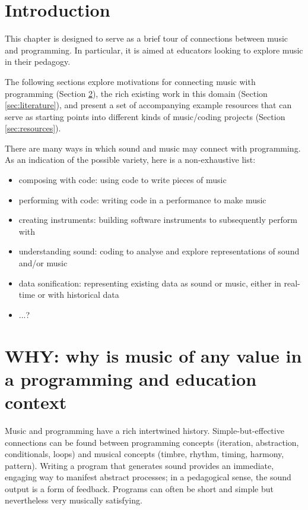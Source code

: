 \section{Introduction}

This chapter is designed to serve as a brief tour of connections between music and programming. In particular, it is aimed at educators looking to explore music in their pedagogy.

The following sections explore motivations for connecting music with programming (Section \ref{sec:why}), the rich existing work in this domain (Section \ref{sec:literature}), and present a set of accompanying example resources that can serve as starting points into different kinds of music/coding projects (Section \ref{sec:resources}).




There are many ways in which sound and music may connect with programming. As an indication of the possible variety, here is a non-exhaustive list:

\begin{itemize}
    \item composing with code: using code to write pieces of music
    \item performing with code: writing code in a performance to make music
    \item creating instruments: building software instruments to subsequently perform with
    \item understanding sound: coding to analyse and explore representations of sound and/or music
    \item data sonification: representing existing data as sound or music, either in real-time or with  historical data
    \item ...?
\end{itemize}



\section{WHY: why is music of any value in a programming and education context} \label{sec:why}

Music and programming have a rich intertwined history. Simple-but-effective connections can be found between programming concepts (iteration, abstraction, conditionals, loops) and musical concepts (timbre, rhythm, timing, harmony, pattern). Writing a program that generates sound provides an immediate, engaging way to manifest abstract processes; in a pedagogical sense, the sound output is a form of feedback. Programs can often be short and simple but nevertheless very musically satisfying. 



